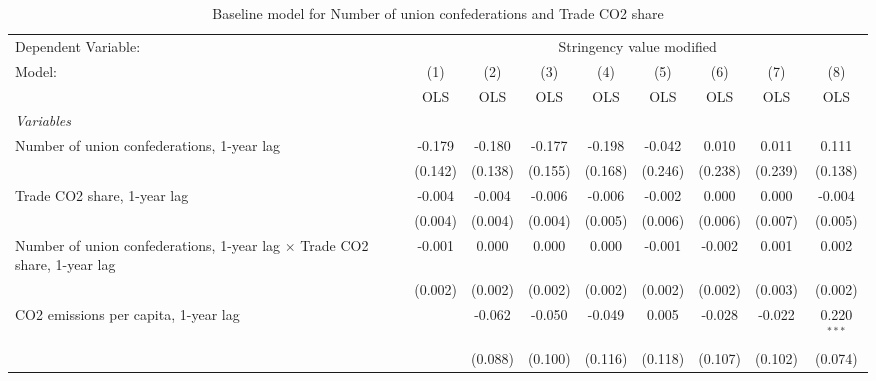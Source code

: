 
\begin{table}[htbp]
   \caption{Baseline model for Number of union confederations and Trade CO2 share}
   \centering
   \begin{tabular}{lcccccccc}
      \toprule
      Dependent Variable: & \multicolumn{8}{c}{Stringency value modified}\\
      Model:                                                                           & (1)     & (2)     & (3)         & (4)     & (5)         & (6)          & (7)          & (8)\\  
                                                                                       &  OLS    & OLS     & OLS         & OLS     & OLS         & OLS          & OLS          & OLS\\  
      \midrule
      \emph{Variables}\\
      Number of union confederations, 1-year lag                                       & -0.179  & -0.180  & -0.177      & -0.198  & -0.042      & 0.010        & 0.011        & 0.111\\   
                                                                                       & (0.142) & (0.138) & (0.155)     & (0.168) & (0.246)     & (0.238)      & (0.239)      & (0.138)\\   
      Trade CO2 share, 1-year lag                                                      & -0.004  & -0.004  & -0.006      & -0.006  & -0.002      & 0.000        & 0.000        & -0.004\\   
                                                                                       & (0.004) & (0.004) & (0.004)     & (0.005) & (0.006)     & (0.006)      & (0.007)      & (0.005)\\   
      Number of union confederations, 1-year lag $\times$ Trade CO2 share, 1-year lag  & -0.001  & 0.000   & 0.000       & 0.000   & -0.001      & -0.002       & 0.001        & 0.002\\   
                                                                                       & (0.002) & (0.002) & (0.002)     & (0.002) & (0.002)     & (0.002)      & (0.003)      & (0.002)\\   
      CO2 emissions per capita, 1-year lag                                             &         & -0.062  & -0.050      & -0.049  & 0.005       & -0.028       & -0.022       & 0.220$^{***}$\\   
                                                                                       &         & (0.088) & (0.100)     & (0.116) & (0.118)     & (0.107)      & (0.102)      & (0.074)\\   

\end{tabular}
\end{table}

